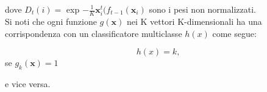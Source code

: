 dove \begin{math}D_t(i) =\end{math} exp \begin{math}-\frac{1}{K}\textbf{x}_i^t(f_{t-1}(\textbf{x}_i)\end{math} sono i pesi non 
normalizzati.\\
\newline
Si noti che ogni funzione \begin{math}
                           g(\textbf{x})
                          \end{math} nei K vettori K-dimensionali ha una corrispondenza con un classificatore 
multiclasse \begin{math}
             h(x)
            \end{math}
 come segue:
\begin{center}
 \begin{equation}\label{eq:cor1}
  h(x) = k, 
 \end{equation}
se \begin{math} g_k(\textbf{x})=1\end{math}
                                 
\end{center}
e vice versa.

